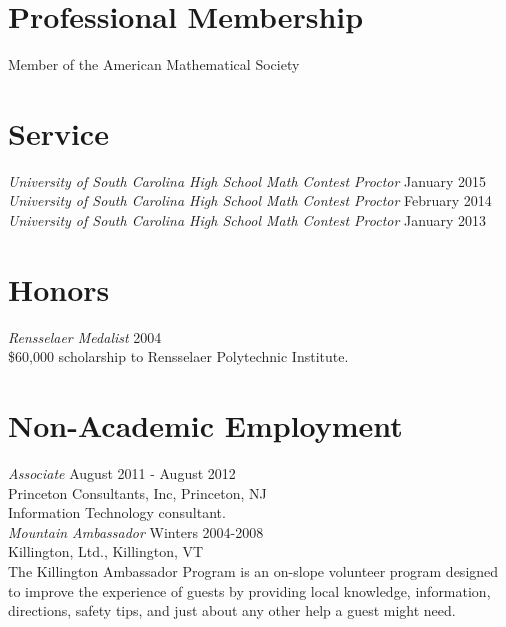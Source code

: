 \documentclass{article}
\begin{document}


  \section*{Professional Membership}
  Member of the American Mathematical Society
  
  \section*{Service}
  \textsl{University of South Carolina High School Math Contest Proctor} \hfill January 2015\\
  \textsl{University of South Carolina High School Math Contest Proctor} \hfill February 2014\\
  \textsl{University of South Carolina High School Math Contest Proctor} \hfill January 2013

  \section*{Honors}
  \textsl{Rensselaer Medalist} \hfill 2004\\
  \$60,000 scholarship to Rensselaer Polytechnic Institute.

  \section*{Non-Academic Employment}             
  \textsl{Associate} \hfill August 2011 - August 2012\\
  Princeton Consultants, Inc, Princeton, NJ\\
  Information Technology consultant.\\

  \noindent\textsl{Mountain Ambassador} \hfill Winters 2004-2008\\
  Killington, Ltd., Killington, VT \\
  The Killington Ambassador Program is an on-slope volunteer program
  designed to improve the experience of guests by providing local knowledge, 
  information, directions, safety tips, and just about any other help a guest might need.
\end{document}
